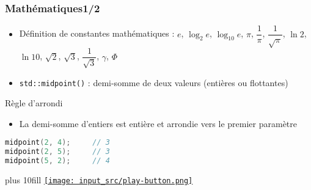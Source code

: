 \documentclass[C++.tex]{subfiles}
\begin{document}
\begin{frame}[fragile]
	\frametitle{Mathématiques\titlehfill{}1/2}
	\begin{itemize}
		\item Définition de constantes mathématiques : $e$, $\log_2 e$, $\log_{10} e$, $\pi$, $\dfrac{1}{\pi}$, $\dfrac{1}{\sqrt{\pi}}$, $\ln{2}$, $\ln{10}$, $\sqrt{2}$, $\sqrt{3}$, $\dfrac{1}{\sqrt{3}}$, $\gamma$, $\Phi$


		\item \lstinline|std::midpoint()| : demi-somme de deux valeurs (entières ou flottantes)
	\end{itemize}

	\begin{block}{Règle d'arrondi}
		\begin{itemize}
			\item La demi-somme d'entiers est entière et arrondie vers le premier paramètre
		\end{itemize}

		\begin{lstlisting}[language=C++]
midpoint(2, 4);     // 3
midpoint(2, 5);     // 3
midpoint(5, 2);     // 4\end{lstlisting}
	\end{block}

	\vskip 10mm plus 10fill
	\hfill
	\href{https://godbolt.org/#g:!((g:!((g:!((h:codeEditor,i:(filename:'1',fontScale:14,fontUsePx:'0',j:1,lang:c%2B%2B,selection:(endColumn:1,endLineNumber:10,positionColumn:1,positionLineNumber:10,selectionStartColumn:1,selectionStartLineNumber:10,startColumn:1,startLineNumber:10),source:'%23include+%3Ciostream%3E%0A%23include+%3Cnumeric%3E%0A%0Aint+main()%0A%7B%0A++std::cout+%3C%3C+std::midpoint(2,+4)+%3C%3C+%22%5Cn%22%3B%0A++std::cout+%3C%3C+std::midpoint(2,+5)+%3C%3C+%22%5Cn%22%3B%0A++std::cout+%3C%3C+std::midpoint(5,+2)+%3C%3C+%22%5Cn%22%3B+%0A%7D%0A'),l:'5',n:'0',o:'C%2B%2B+source+%231',t:'0')),k:50,l:'4',n:'0',o:'',s:0,t:'0'),(g:!((h:executor,i:(argsPanelShown:'1',compilationPanelShown:'0',compiler:g112,compilerOutShown:'0',execArgs:'',execStdin:'',fontScale:14,fontUsePx:'0',j:1,lang:c%2B%2B,libs:!((name:boost,ver:'175')),options:'-std%3Dc%2B%2B20',source:1,stdinPanelShown:'1',tree:'1',wrap:'0'),l:'5',n:'0',o:'Executor+x86-64+gcc+11.2+(C%2B%2B,+Editor+%231)',t:'0')),header:(),k:50,l:'4',n:'0',o:'',s:0,t:'0')),l:'2',n:'0',o:'',t:'0')),version:4}{\texttt{[image: input\_src/play-button.png]}}
\end{frame}
\end{document}
